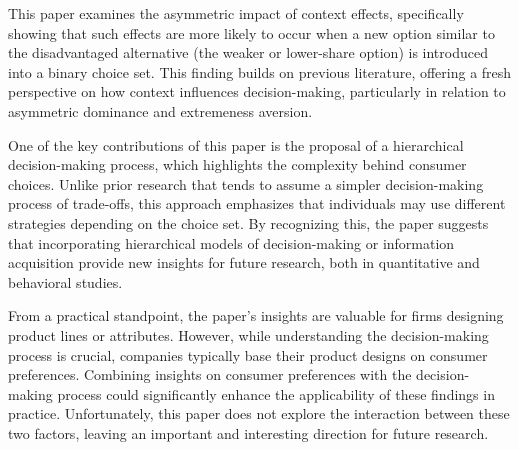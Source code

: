 \documentclass[11pt]{elegantbook}
\begin{document}
This paper examines the asymmetric impact of context effects, specifically showing that such effects are more likely to occur when a new option similar to the disadvantaged alternative (the weaker or lower-share option) is introduced into a binary choice set. This finding builds on previous literature, offering a fresh perspective on how context influences decision-making, particularly in relation to asymmetric dominance and extremeness aversion.

One of the key contributions of this paper is the proposal of a hierarchical decision-making process, which highlights the complexity behind consumer choices. Unlike prior research that tends to assume a simpler decision-making process of trade-offs, this approach emphasizes that individuals may use different strategies depending on the choice set. By recognizing this, the paper suggests that incorporating hierarchical models of decision-making or information acquisition provide new insights for future research, both in quantitative and behavioral studies.

From a practical standpoint, the paper’s insights are valuable for firms designing product lines or attributes. However, while understanding the decision-making process is crucial, companies typically base their product designs on consumer preferences. Combining insights on consumer preferences with the decision-making process could significantly enhance the applicability of these findings in practice. Unfortunately, this paper does not explore the interaction between these two factors, leaving an important and interesting direction for future research.
\end{document}
